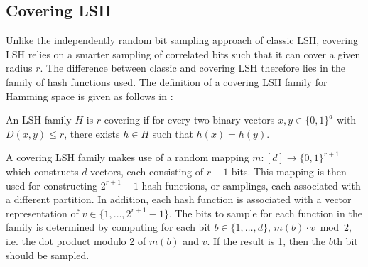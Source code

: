 \subsection{Covering LSH}
\label{background-covering-lsh}

Unlike the independently random bit sampling approach of classic LSH, covering LSH relies on a smarter sampling of correlated bits such that it can cover a given radius $r$. The difference between classic and covering LSH therefore lies in the family of hash functions used. The definition of a covering LSH family for Hamming space is given as follows in \cite{DBLP:journals/corr/PhamP16}:

\begin{definition}
\label{definition-covering-family}
  An LSH family $H$ is $r$-covering if for every two binary vectors $x, y \in \{0, 1\}^d$ with $D(x, y) \leq r$, there exists $h \in H$ such that $h(x) = h(y)$.
\end{definition}

A covering LSH family makes use of a random mapping $m \colon [d] \rightarrow \{0, 1\}^{r + 1}$ which constructs $d$ vectors, each consisting of $r + 1$ bits. This mapping is then used for constructing $2^{r + 1} - 1$ hash functions, or samplings, each associated with a different partition. In addition, each hash function is associated with a vector representation of $v \in \{1, \ldots, 2^{r + 1} - 1\}$. The bits to sample for each function in the family is determined by computing for each bit $b \in \{1, \ldots, d\}$, $m(b) \cdot v \bmod 2$, i.e. the dot product modulo 2 of $m(b)$ and $v$. If the result is 1, then the $b$th bit should be sampled.

